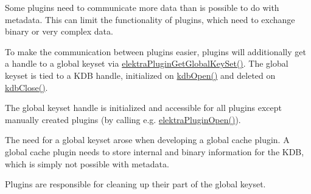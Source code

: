 Some plugins need to communicate more data than is possible to do with metadata. This can limit the functionality of plugins, which need to exchange binary or very complex data.

To make the communication between plugins easier, plugins will additionally get a handle to a global keyset via {\ttfamily \mbox{\hyperlink{group__plugin_ga436cda13ed70c0face08661a90620bf6}{elektra\+Plugin\+Get\+Global\+Key\+Set()}}}. The global keyset is tied to a K\+DB handle, initialized on {\ttfamily \mbox{\hyperlink{group__kdb_ga6808defe5870f328dd17910aacbdc6ca}{kdb\+Open()}}} and deleted on {\ttfamily \mbox{\hyperlink{group__kdb_gadb54dc9fda17ee07deb9444df745c96f}{kdb\+Close()}}}.

The global keyset handle is initialized and accessible for all plugins except manually created plugins (by calling e.\+g. {\ttfamily \mbox{\hyperlink{elektra_2plugin_8c_a32a70a7876542c51d153164ac5108a57}{elektra\+Plugin\+Open()}}}).

The need for a global keyset arose when developing a global cache plugin. A global cache plugin needs to store internal and binary information for the K\+DB, which is simply not possible with metadata.

Plugins are responsible for cleaning up their part of the global keyset.